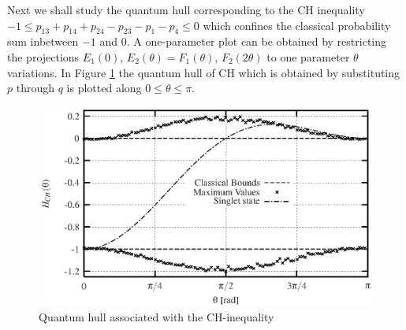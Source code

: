 Next we shall study the quantum hull corresponding to the CH inequality
$ -1\leq p_{13} + p_{14} + p_{24} - p_{23} - p_{1} - p_{4} \leq 0$
which confines the classical probability sum inbetween $-1$ and $0$.
A one-parameter plot
can be obtained by restricting the projections
${E}_1(0)$, ${E}_2(\theta)={F}_1(\theta)$, ${F}_2(2\theta)$ to one parameter
$\theta$ variations.
In Figure  \ref{f-2003-qpoly-3} the quantum hull of CH
which is obtained by substituting $p$ through $q$ is plotted
along $0 \le \theta \le \pi$.
\begin{figure}
  \centering
  \includegraphics[clip]{2003-qpoly-plotch}
  \caption{Quantum hull associated with the CH-inequality}
  \label{f-2003-qpoly-3}
\end{figure}

